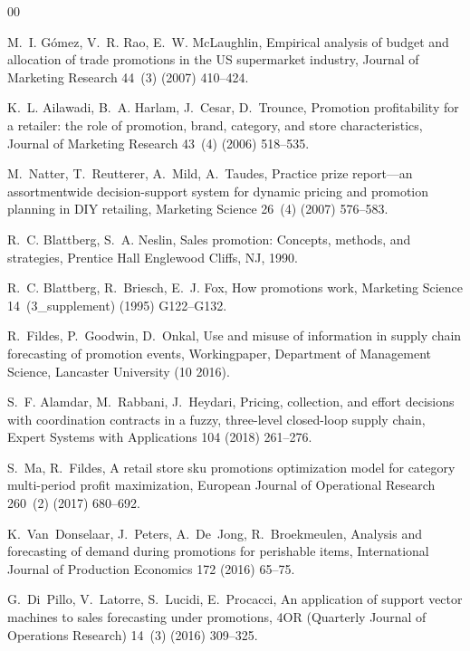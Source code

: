\documentclass{ieeeaccess}
\begin{document}
\begin{thebibliography}{00}

M.~I. G{\'o}mez, V.~R. Rao, E.~W. McLaughlin, Empirical analysis of budget and
  allocation of trade promotions in the {US} supermarket industry, Journal of
  Marketing Research 44~(3) (2007) 410--424.

K.~L. Ailawadi, B.~A. Harlam, J.~Cesar, D.~Trounce, Promotion profitability for
  a retailer: the role of promotion, brand, category, and store
  characteristics, Journal of Marketing Research 43~(4) (2006) 518--535.

M.~Natter, T.~Reutterer, A.~Mild, A.~Taudes, Practice prize report—an
  assortmentwide decision-support system for dynamic pricing and promotion
  planning in {DIY} retailing, Marketing Science 26~(4) (2007) 576--583.

R.~C. Blattberg, S.~A. Neslin, Sales promotion: Concepts, methods, and
  strategies, Prentice Hall Englewood Cliffs, NJ, 1990.

R.~C. Blattberg, R.~Briesch, E.~J. Fox, How promotions work, Marketing Science
  14~(3\_supplement) (1995) G122--G132.

R.~Fildes, P.~Goodwin, D.~Onkal, Use and misuse of information in supply chain
  forecasting of promotion events, Workingpaper, Department of Management
  Science, Lancaster University (10 2016).

S.~F. Alamdar, M.~Rabbani, J.~Heydari, Pricing, collection, and effort
  decisions with coordination contracts in a fuzzy, three-level closed-loop
  supply chain, Expert Systems with Applications 104 (2018) 261--276.

S.~Ma, R.~Fildes, A retail store sku promotions optimization model for category
  multi-period profit maximization, European Journal of Operational Research
  260~(2) (2017) 680--692.

K.~Van~Donselaar, J.~Peters, A.~De~Jong, R.~Broekmeulen, Analysis and
  forecasting of demand during promotions for perishable items, International
  Journal of Production Economics 172 (2016) 65--75.

G.~Di~Pillo, V.~Latorre, S.~Lucidi, E.~Procacci, An application of support
  vector machines to sales forecasting under promotions, 4OR (Quarterly Journal
  of Operations Research) 14~(3) (2016) 309--325.


\end{thebibliography}
\end{document}
